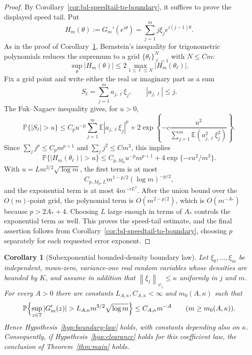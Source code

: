 \documentclass[11pt]{amsart}
\numberwithin{equation}{section}
\newtheorem{corollary}[theorem]{Corollary}
\theoremstyle{definition}
\theoremstyle{remark}
\newcommand{\T}{\mathbb T}
\newcommand{\Prob}{\mathbb P}
\newcommand{\Exp}{\mathbb E}
\newcommand{\norm}[1]{\left\lVert #1\right\rVert}
\newcommand{\abs}[1]{\left\lvert #1\right\rvert}
\begin{document}
\begin{proof}
By Corollary~\ref{cor:bd-speedtail-to-boundary}, it suffices to prove the
displayed speed tail.  Put
\[
  H_m(\theta):=G_m'(e^{i\theta})
  =\sum_{j=1}^m j\xi_j e^{i(j-1)\theta}.
\]
As in the proof of Corollary~\ref{cor:bd-subexp-boundary}, Bernstein's
inequality for trigonometric polynomials reduces the supremum to a grid
\(\{\theta_\ell\}_{\ell=1}^N\) with \(N\le C m\):
\[
  \sup_\theta\abs{H_m(\theta)}
  \le 2\max_{1\le\ell\le N}\abs{H_m(\theta_\ell)}.
\]
Fix a grid point and write either the real or imaginary part as a sum
\[
  S_\ell=\sum_{j=1}^m a_{j,\ell}\xi_j,
  \qquad \abs{a_{j,\ell}}\le j .
\]
The Fuk--Nagaev inequality \cite{FukNagaev} gives, for \(u>0\),
\[
  \Prob\{\abs{S_\ell}>u\}
  \le
  C_pu^{-p}\sum_{j=1}^m\Exp\abs{a_{j,\ell}\xi_j}^{p}
  +2\exp\left\{-c\frac{u^2}{\sum_{j=1}^m\Exp(a_{j,\ell}^2\xi_j^2)}\right\}.
\]
Since \(\sum_j j^p\le C_pm^{p+1}\) and \(\sum_j j^2\le C m^3\), this implies
\[
  \Prob\{\abs{H_m(\theta_\ell)}>u\}
  \le C_{p,M_p}u^{-p}m^{p+1}
     +4\exp\{-c u^2/m^3\}.
\]
With \(u=Lm^{3/2}\sqrt{\log m}\), the first term is at most
\[
  C_{p,M_p,L}m^{1-p/2}(\log m)^{-p/2},
\]
and the exponential term is at most \(4m^{-cL^2}\).  After the union bound over
the \(O(m)\)-point grid, the polynomial term is \(O(m^{2-p/2})\), which is
\(O(m^{-A_\ast})\) because \(p>2A_\ast+4\).  Choosing \(L\) large enough in
terms of \(A_\ast\) controls the exponential term as well.  This proves the
speed-tail estimate, and the final assertion follows from
Corollary~\ref{cor:bd-speedtail-to-boundary}, choosing \(p\) separately for
each requested error exponent.
\end{proof}

\begin{corollary}[Subexponential bounded-density boundary law]
\label{cor:bd-subexp-boundary}
Let \(\xi_0,\ldots,\xi_m\) be independent, mean-zero, variance-one real random
variables whose densities are bounded by \(K\), and assume in addition that
\(\norm{\xi_j}_{\psi_1}\le\kappa\) uniformly in \(j\) and \(m\).  For every
\(A>0\) there are constants \(L_{A,\kappa},C_{A,\kappa}<\infty\) and
\(m_0(A,\kappa)\) such that
\[
  \Prob\Bigl\{\sup_{z\in\T}\abs{G_m'(z)}
    >L_{A,\kappa}m^{3/2}\sqrt{\log m}\Bigr\}
  \le C_{A,\kappa}m^{-A}
  \qquad(m\ge m_0(A,\kappa)).
\]
Hence Hypothesis~\ref{hyp:boundary-law} holds, with constants depending also
on \(\kappa\).  Consequently, if Hypothesis~\ref{hyp:clearance} holds for this
coefficient law, the conclusion of Theorem~\ref{thm:main} holds.
\end{corollary}
\end{document}
